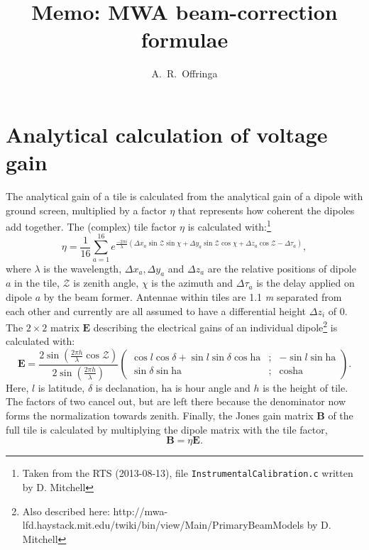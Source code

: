 \documentclass[a4paper,11pt]{article}
\title{Memo: MWA beam-correction formulae}
\author{A.~R.~Offringa}
\begin{document}
\label{firstpage}
\maketitle

\section{Analytical calculation of voltage gain}
The analytical gain of a tile is calculated from the analytical gain of a dipole with ground screen, multiplied by a factor $\eta$ that represents how coherent the dipoles add together. The (complex) tile factor $\eta$ is calculated with:\footnote{Taken from the RTS (2013-08-13), file \texttt{InstrumentalCalibration.c} written by D. Mitchell}
\begin{equation}
 \eta = \frac{1}{16}\sum\limits_{a=1}^{16} e^{\frac{-2 \pi i}{\lambda} \left(\Delta x_a \sin \mathcal{Z} \sin \chi + \Delta y_a \sin \mathcal{Z} \cos \chi + \Delta z_a \cos \mathcal{Z} - \Delta \tau_a \right) },
\end{equation}
where $\lambda$ is the wavelength, $\Delta x_a, \Delta y_a$ and $\Delta z_a$ are the relative positions of dipole $a$ in the tile, $\mathcal{Z}$ is zenith angle, $\chi$ is the azimuth and $\Delta \tau_a$ is the delay applied on dipole $a$ by the beam former. Antennae within tiles are 1.1 \textit{m} separated from each other and currently are all assumed to have a differential height $\Delta z_i$ of 0. The $2 \times 2$ matrix $\textbf{E}$ describing the electrical gains of an individual dipole\footnote{Also described here: http://mwa-lfd.haystack.mit.edu/twiki/bin/view/Main/PrimaryBeamModels by D. Mitchell} is calculated with:
\begin{equation}
\mathbf{E} = \frac{2 \sin \left( \frac{2 \pi h}{\lambda} \cos \mathcal{Z}\right)}{2 \sin \left( \frac{2 \pi h}{\lambda}\right)}
\left( \begin{array}{ccc}
\cos l \cos \delta + \sin l \sin \delta \cos \textrm{ha} & ; & -\sin l \sin \textrm{ha} \\
\sin \delta \sin \textrm{ha} & ; & \cos \textrm{ha}
\end{array} \right).
\end{equation}
Here, $l$ is latitude, $\delta$ is declanation, $\textrm{ha}$ is hour angle and $h$ is the height of tile. The factors of two cancel out, but are left there because the denominator now forms the normalization towards zenith. Finally, the Jones gain matrix $\textbf{B}$ of the full tile is calculated by multiplying the dipole matrix with the tile factor,
\begin{equation}
\mathbf{B} = \eta \mathbf{E}.
\end{equation}
\end{document}
